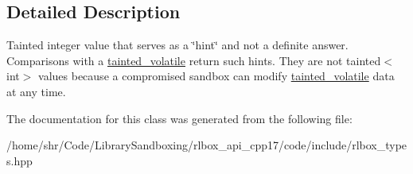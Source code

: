 \subsection{Detailed Description}
Tainted integer value that serves as a \char`\"{}hint\char`\"{} and not a definite answer. Comparisons with a \hyperlink{classrlbox_1_1tainted__volatile}{tainted\+\_\+volatile} return such hints. They are not {\ttfamily tainted$<$int$>$} values because a compromised sandbox can modify \hyperlink{classrlbox_1_1tainted__volatile}{tainted\+\_\+volatile} data at any time. 

The documentation for this class was generated from the following file\+:\begin{DoxyCompactItemize}
\item 
/home/shr/\+Code/\+Library\+Sandboxing/rlbox\+\_\+api\+\_\+cpp17/code/include/rlbox\+\_\+types.\+hpp\end{DoxyCompactItemize}

